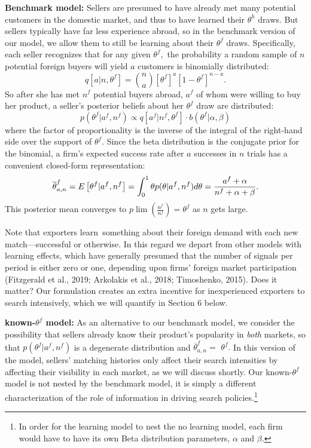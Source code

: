 \documentclass[12pt]{article}
\begin{document}
\textbf{Benchmark model:} Sellers are presumed to have already met many
potential customers in the domestic market, and thus to have learned their $%
\theta ^{h}$ draws. But sellers typically have far less experience abroad,
so in the benchmark version of our model, we allow them to still be learning
about their $\theta ^{f}$ draws. Specifically, each seller recognizes that
for any given $\theta ^{f},$ the probability a random sample of $n$
potential foreign buyers will yield $a$ customers is binomially distributed: 
\begin{equation*}
q\left[ a|n,\theta ^{f}\right] =\binom{n}{a}\left[ \theta ^{f}\right] ^{a}%
\left[ 1-\theta ^{f}\right] ^{n-a}.
\end{equation*}%
So after she has met $n^{f}$ potential buyers abroad, $a^{f}$ of whom were
willing to buy her product, a seller's posterior beliefs about her $\theta
^{f}$ draw are distributed:%
\begin{equation*}
p(\theta ^{f}|a^{f},n^{f})\propto q\left[ a^{f}|n^{f},\theta ^{f}\right]
\cdot b(\theta ^{f}|\alpha ,\beta )
\end{equation*}%
where the factor of proportionality is the inverse of the integral of the
right-hand side over the support of $\theta ^{f}$. Since the beta
distribution is the conjugate prior for the binomial, a firm's expected
success rate after $a$ successes in $n$ trials has a convenient closed-form
representation: 
\begin{equation}
\overline{\theta }_{a,n}^{f}=E\left[ \theta ^{f}|a^{f},n^{f}\right]
=\int_{0}^{1}\theta p(\theta |a^{f},n^{f})d\theta =\frac{a^{f}+\alpha }{%
n^{f}+\alpha +\beta }.  \label{success_probability}
\end{equation}%
This posterior mean converges to $p\lim \left( \frac{a^{f}}{n^{f}}\right)
=\theta ^{f}$ as $n$ gets large.

Note that exporters learn\ something about their foreign demand with each
new match---successful or otherwise. In this regard we depart from other
models with learning effects, which have generally presumed that the number
of signals per period is either zero or one, depending upon firms' foreign
market participation (Fitzgerald et al., 2019; Arkolakis et al., 2018;
Timoshenko, 2015). Does it matter? Our formulation creates an extra
incentive for inexperienced exporters to search intensively, which we will
quantify in Section 6 below.

\textbf{known-$\theta ^{f}$ model: }As an alternative to our benchmark
model, we consider the possibility that sellers already know their product's
popularity in \textit{both} markets, so that $p(\theta ^{f}|a^{f},n^{f})$ is
a degenerate distribution and $\overline{\theta }_{a,n}^{f}=$ $\theta ^{f}.$
In this version of the model, sellers' matching histories only affect their
search intensities by affecting their visibility in each market, as we will
discuss shortly. Our known-$\theta ^{f}$ model is not nested by the
benchmark model, it is simply a different characterization of the role of
information in driving search policies.\footnote{%
In order for the learning model to nest the no learning model, each firm
would have to have its own Beta distribution parameters, $\alpha $ and $%
\beta .$ \medskip}
\end{document}
